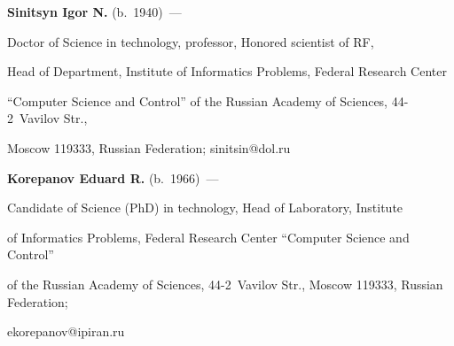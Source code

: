 \textbf{Sinitsyn Igor N.} (b.\ 1940)~---


Doctor of Science in technology, professor, Honored scientist of RF, 


Head of Department, Institute of Informatics Problems, Federal Research Center 


``Computer Science and Control'' of the Russian Academy of Sciences, 44-2~Vavilov Str., 


Moscow 119333, Russian Federation; sinitsin@dol.ru 





\vspace*{3pt}





\noindent


\textbf{Korepanov Eduard R.} (b.\ 1966)~---


Candidate of Science (PhD) in technology, Head of Laboratory, Institute 


of Informatics Problems, Federal Research Center ``Computer Science and Control'' 


of the Russian Academy of Sciences, 44-2~Vavilov Str., Moscow 119333, Russian Federation;


ekorepanov@ipiran.ru








\label{end\stat}








\renewcommand{\bibname}{\protect\rm Литература}


